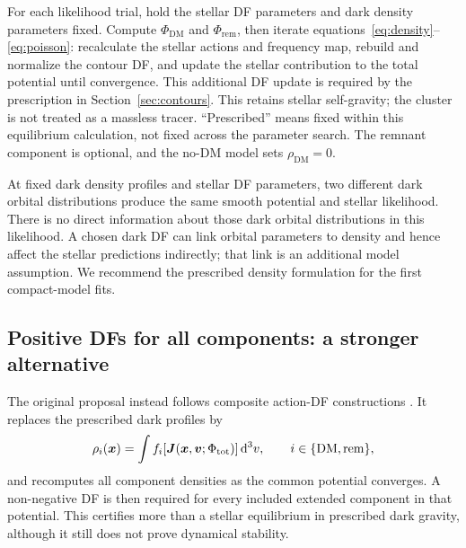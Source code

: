 \documentclass[11pt,a4paper]{article}
\newcommand{\dd}{\mathrm{d}}
\newcommand{\dm}{\mathrm{DM}}
\newcommand{\remn}{\mathrm{rem}}
\begin{document}
For each likelihood trial, hold the stellar DF parameters and dark density
parameters fixed. Compute $\Phi_\dm$ and $\Phi_\remn$, then iterate
equations~\eqref{eq:density}--\eqref{eq:poisson}: recalculate the stellar
actions and frequency map, rebuild and normalize the contour DF, and update
the stellar contribution to the total potential until convergence. This
additional DF update is required by the prescription in
Section~\ref{sec:contours}. This retains stellar self-gravity;
the cluster is not treated as a massless tracer. ``Prescribed'' means fixed
within this equilibrium calculation, not fixed across the parameter search.
The remnant component is optional, and the no-DM model sets $\rho_\dm=0$.

At fixed dark density profiles and stellar DF parameters, two different
dark orbital distributions produce the same smooth potential and stellar
likelihood. There is no direct information about those dark orbital
distributions in this likelihood. A chosen dark DF can link orbital
parameters to density and hence affect the stellar predictions indirectly;
that link is an additional model assumption. We recommend the prescribed
density formulation for the first compact-model fits.

\subsection{Positive DFs for all components: a stronger alternative}
\label{sec:dark-dfs}

The original proposal instead follows composite action-DF constructions
\citep{2018MNRAS.480..927P,2023MNRAS.520.1832B}. It replaces the prescribed
dark profiles by
\begin{equation}
 \rho_i(\boldsymbol x)=\int
 f_i[\boldsymbol J(\boldsymbol x,\boldsymbol v;\Phi_{\rm tot})]\,\dd^3v,
 \qquad i\in\{\dm,\remn\},
 \label{eq:dark-df-density}
\end{equation}
and recomputes all component densities as the common potential converges.
A non-negative DF is then required for every included extended component
in that potential. This certifies more than a stellar equilibrium in
prescribed dark gravity, although it still does not prove dynamical stability.
\end{document}
